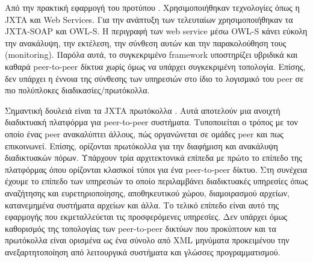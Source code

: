 Από την πρακτική εφαρμογή του προτύπου \citep{Amoretti2005SP2A}. 
Χρησιμοποιήθηκαν τεχνολογίες όπως η JXTA και Web Services. Για την ανάπτυξη 
των τελευταίων χρησιμοποιήθηκαν τα JXTA-SOAP και OWL-S. Η περιγραφή των web 
service μέσω OWL-S κάνει εύκολη την ανακάλυψη, την εκτέλεση, την σύνθεση 
αυτών και την παρακολούθηση τους (monitoring). Παρόλα αυτά, το συγκεκριμένο 
framework υποστηρίζει υβριδικά και καθαρά peer-to-peer δίκτυα χωρίς όμως να 
υπάρχει συγκεκριμένη τοπολογία. Επίσης, δεν υπάρχει η έννοια της 
σύνθεσης των υπηρεσιών στο ίδιο το λογισμικό του peer σε πιο πολύπλοκες 
διαδικασίες/πρωτόκολλα.

Σημαντική δουλειά είναι τα JXTA πρωτόκολλα \citep{JXTA2007}. Αυτά 
αποτελούν μια ανοιχτή διαδικτυακή πλατφόρμα για peer-to-peer συστήματα. 
Τυποποιείται ο τρόπος με τον οποίο ένας peer ανακαλύπτει άλλους, πώς 
οργανώνεται σε ομάδες peer και πως επικοινωνεί. Επίσης, ορίζονται 
πρωτόκολλα για την διαφήμιση και ανακάλυψη διαδικτυακών πόρων. Υπάρχουν 
τρία αρχιτεκτονικά επίπεδα με πρώτο το επίπεδο της πλατφόρμας όπου 
ορίζονται κλασικοί τύποι για ένα peer-to-peer δίκτυο. Στη συνέχεια 
έχουμε το επίπεδο των υπηρεσιών το οποίο περιλαμβάνει διαδικτυακές 
υπηρεσίες όπως αναζήτησης και ευρετηριοποίησης, αποθηκευτικού χώρου, 
διαμοιρασμού αρχείων, κατανεμημένα συστήματα αρχείων και άλλα. Το τελικό 
επίπεδο είναι αυτό της εφαρμογής που εκμεταλλεύεται τις προσφερόμενες 
υπηρεσίες. Δεν υπάρχει όμως καθορισμός της τοπολογίας των peer-to-peer 
δικτύων που προκύπτουν και τα πρωτόκολλα είναι ορισμένα ως ένα σύνολο 
από XML μηνύματα προκειμένου την ανεξαρτητοποίηση από λειτουργικά 
συστήματα και γλώσσες προγραμματισμού.
